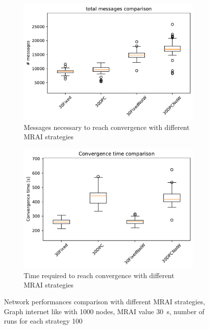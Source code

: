 \begin{figure}[h]
     \centering
     \begin{subfigure}[b]{0.49\textwidth}
         \centering
         \includegraphics[width=\textwidth]{images/internet_like/1000/comparison/comparison_messages_boxplot.pdf}
		 \caption{Messages necessary to reach convergence
			with different \ac{MRAI} strategies}
         \label{fig:boxplot_internet_like_1000_messages}
     \end{subfigure}
     \hfill
     \begin{subfigure}[b]{0.475\textwidth}
         \centering
         \includegraphics[width=\textwidth]{images/internet_like/1000/comparison/comparison_time_boxplot.pdf}
		 \caption{Time required to reach convergence
			with different \ac{MRAI} strategies}
         \label{fig:boxplot_internet_like_1000_time}
     \end{subfigure}
	 \caption{Network performances comparison with different \ac{MRAI} strategies,
		Graph internet like with \num{1000} nodes, \ac{MRAI} value
		\SI{30}{\second}, number of runs for each strategy \num{100}}
        \label{fig:boxplot_internet_like_1000}
\end{figure}

